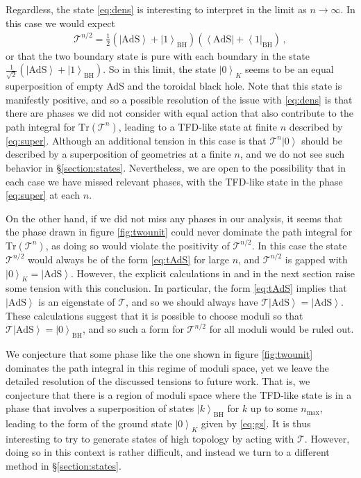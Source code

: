 \documentclass[letterpaper,12pt]{article}
\def\DM#1{{\color{red}{ [#1]}}}
\newcommand{\ban}[1]{\begin{align}#1\end{align}}
\newcommand{\Tr}{\text{Tr}}
\newcommand{\ket}[1]{\left| #1\right>}
\newcommand{\bra}[1]{\left< #1\right|}
\begin{document}
\DM{The bit below needs to be rewritten.  I think you are working on this, and I will do more later.}
 
Regardless, the state \eqref{eq:dens} is interesting to interpret in the limit as $n \to \infty$. In this case we would expect
\ban{
\mathcal T^{n/2} = \frac 12 \left( \ket{\text{AdS}} +\ket 1_\text{BH}\right)\left( \bra{\text{AdS}} +\bra 1_\text{BH}\right) \label{eq:super}\, ,
}
or that the two boundary state is pure with each boundary in the state $\frac 1{\sqrt 2} \left( \ket{\text{AdS}} +\ket 1_\text{BH}\right)$. So in this limit, the state $\ket 0_K$ seems to be an equal superposition of empty AdS and the toroidal black hole. Note that this state is manifestly positive, and so a possible resolution of the issue with \eqref{eq:dens} is that there are phases we did not consider with equal action that also contribute to the path integral for $\Tr(\mathcal T^n)$, leading to a TFD-like state at finite $n$ described by \eqref{eq:super}. Although an additional tension in this case is that $\mathcal T^n \ket 0$ should be described by a superposition of geometries at a finite $n$, and we do not see such behavior in \S\ref{section:states}. Nevertheless, we are open to the possibility that in each case we have missed relevant phases, with the TFD-like state in the phase \eqref{eq:super} at each $n$.

On the other hand, if we did not miss any phases in our analysis, it seems that the phase drawn in figure \ref{fig:twounit} could never dominate the path integral for $\Tr(\mathcal T^n)$, as doing so would violate the positivity of $\mathcal T^{n/2}$. In this case the state $\mathcal T^{n/2}$ would always be of the form \eqref{eq:tAdS} for large $n$, and $\mathcal T^{n/2}$ is gapped with $\ket 0_K = \ket{\text{AdS}}$. However, the explicit calculations in \cite{MRW} and in the next section raise some tension with this conclusion. In particular, the form \eqref{eq:tAdS} implies that $\ket{\text{AdS}}$ is an eigenstate of $\mathcal T$, and so we should always have $\mathcal T \ket{\text{AdS}} = \ket{\text{AdS}}$. These calculations suggest that it is possible to choose moduli so that $\mathcal T \ket{\text{AdS}} = \ket{0}_\text{BH}$, and so such a form for $\mathcal T^{n/2}$ for all moduli would be ruled out.

We conjecture that some phase like the one shown in figure \ref{fig:twounit} dominates the path integral in this regime of moduli space, yet we leave the detailed resolution of the discussed tensions to future work. That is, we conjecture that there is a region of moduli space where the TFD-like state is in a phase that involves a superposition of states $\ket k_\text{BH}$ for $k$ up to some $n_\text{max}$, leading to the form of the ground state $\ket 0_K$ given by \eqref{eq:gs}.  It is thus interesting to try to generate states of high topology by acting with $\mathcal T$. However, doing so in this context is rather difficult, and instead we turn to a different method in \S\ref{section:states}.
\end{document}
